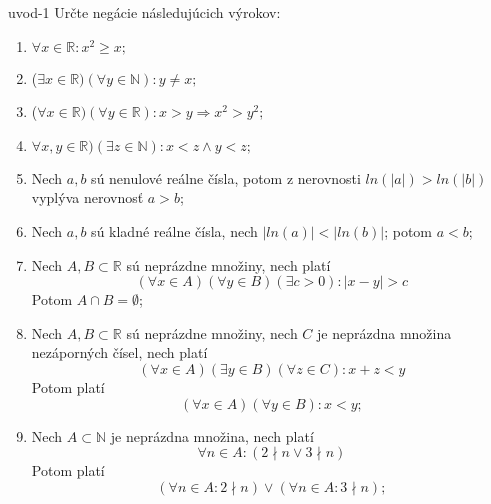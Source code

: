 \begin{defproblem}{uvod-1}
  Určte negácie následujúcich výrokov:
  \begin{enumerate}
    \item $\forall x \in \mathbb{R} : x^2 \geq x;$
    \item ($\exists x \in \mathbb{R})(\forall y \in \mathbb{N}): y \neq x;$
    \item ($\forall x \in \mathbb{R})(\forall y \in \mathbb{R}): 
          x > y \Rightarrow x^2 > y^2;$
    \item $\forall x, y \in \mathbb{R})(\exists z \in \mathbb{N}): x < z \land
          y < z;$
    \item Nech $a, b$ sú nenulové reálne čísla, potom z nerovnosti $ln(|a|)
          > ln(|b|)$ vyplýva nerovnosť $a > b$;
    \item Nech $a, b$ sú kladné reálne čísla, nech $|ln(a)| < |ln(b)|$; potom
          $a < b$;
    \item Nech $A, B \subset \mathbb{R}$ sú neprázdne množiny, nech platí
          $$(\forall x \in A)(\forall y \in B)(\exists c > 0): |x - y| > c$$
          Potom $A \cap B = \emptyset$;
    \item Nech $A, B \subset \mathbb{R}$ sú neprázdne množiny, nech $C$ je
          neprázdna množina nezáporných čísel, nech platí
          $$(\forall x \in A)(\exists y \in B)(\forall z \in C): x + z < y$$
          Potom platí
          $$(\forall x \in A)(\forall y \in B): x < y;$$
    \item Nech $A \subset \mathbb{N}$ je neprázdna množina, nech platí
          $$\forall n \in A: (2 \nmid n \lor 3 \nmid n)$$
          Potom platí
          $$(\forall n \in A: 2 \nmid n) \lor (\forall n \in A: 3 \nmid n);$$
  \end{enumerate}
\end{defproblem}
